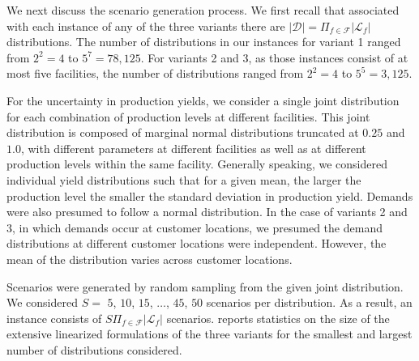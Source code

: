\documentclass[12pt]{article}
\theoremstyle{thmstylethree}%
\newcommand{\mtc}[1] {\mathcal{#1}}
\begin{document}
We next discuss the scenario generation process. We first recall that associated with each instance of any of the three variants there are $\vert \mathcal{D} \vert =  \Pi_{f\in\mtc{F}}\vert  \mathcal{L}_f \vert$ distributions. The number of distributions in our instances for variant 1  ranged from $2^2=4$ to $5^7=78,125$. For variants 2 and 3, as those instances consist of at most five facilities, the number of distributions ranged from $2^2=4$ to $5^5=3,125.$ 

For the uncertainty in production yields, we consider a single joint distribution for each combination of production levels at different facilities.
This joint distribution is composed of marginal normal distributions truncated at $0.25$ and $1.0$, with different parameters at different facilities as well as at different production levels within the same facility. Generally speaking, we considered individual yield distributions such that for a given mean, the larger the production level the smaller the standard deviation in production yield.
Demands were also presumed to follow a normal distribution. In the case of variants 2 and 3, in which demands occur at customer locations, we presumed the demand distributions at different customer locations were independent. However, the mean of the distribution varies across customer locations.

Scenarios were generated by random sampling from the given joint distribution. We considered $S =$ $5$, $10$, $15$, $\ldots$, $45$, $50$ scenarios per distribution. As a result, an instance consists of $S\Pi_{f\in\mtc{F}}\vert\mathcal{L}_f \vert$  scenarios. %
 reports statistics on the size of the extensive linearized formulations of the three variants for the smallest and largest number of distributions considered.
\end{document}
